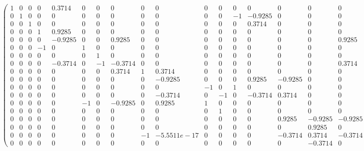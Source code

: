 \documentclass[9pt,letterpaper]{article}
\begin{document}
	\[
	\left(\begin{array}{cccccccccccccccccc} 1 & 0 & 0 & 0 & 0.3714 & 0 & 0 & 0 & 0 & 0 & 0 & 0 & 0 & 0 & 0 & 0 & 0 & 0\\ 0 & 1 & 0 & 0 & 0 & 0 & 0 & 0 & 0 & 0 & 0 & 0 & -1 & -0.9285 & 0 & 0 & 0 & 0\\ 0 & 0 & 1 & 0 & 0 & 0 & 0 & 0 & 0 & 0 & 0 & 0 & 0 & 0.3714 & 0 & 0 & 0 & 0\\ 0 & 0 & 0 & 1 & 0.9285 & 0 & 0 & 0 & 0 & 0 & 0 & 0 & 0 & 0 & 0 & 0 & 0 & 0\\ 0 & 0 & 0 & 0 & -0.9285 & 0 & 0 & 0.9285 & 0 & 0 & 0 & 0 & 0 & 0 & 0 & 0 & 0.9285 & 0\\ 0 & 0 & 0 & -1 & 0 & 1 & 0 & 0 & 0 & 0 & 0 & 0 & 0 & 0 & 0 & 0 & 0 & 0\\ 0 & 0 & 0 & 0 & 0 & 0 & 1 & 0 & 0 & 0 & 0 & 0 & 0 & 0 & 0 & 0 & 0 & 0\\ 0 & 0 & 0 & 0 & -0.3714 & 0 & -1 & -0.3714 & 0 & 0 & 0 & 0 & 0 & 0 & 0 & 0 & 0.3714 & 1\\ 0 & 0 & 0 & 0 & 0 & 0 & 0 & 0.3714 & 1 & 0.3714 & 0 & 0 & 0 & 0 & 0 & 0 & 0 & 0\\ 0 & 0 & 0 & 0 & 0 & 0 & 0 & 0 & 0 & -0.9285 & 0 & 0 & 0 & 0.9285 & -0.9285 & 0 & 0 & 0\\ 0 & 0 & 0 & 0 & 0 & 0 & 0 & 0 & 0 & 0 & -1 & 0 & 1 & 0 & 0 & 0 & 0 & 0\\ 0 & 0 & 0 & 0 & 0 & 0 & 0 & 0 & 0 & -0.3714 & 0 & -1 & 0 & -0.3714 & 0.3714 & 0 & 0 & 0\\ 0 & 0 & 0 & 0 & 0 & -1 & 0 & -0.9285 & 0 & 0.9285 & 1 & 0 & 0 & 0 & 0 & 0 & 0 & 0\\ 0 & 0 & 0 & 0 & 0 & 0 & 0 & 0 & 0 & 0 & 0 & 1 & 0 & 0 & 0 & 0 & 0 & 0\\ 0 & 0 & 0 & 0 & 0 & 0 & 0 & 0 & 0 & 0 & 0 & 0 & 0 & 0 & 0.9285 & -0.9285 & -0.9285 & 0\\ 0 & 0 & 0 & 0 & 0 & 0 & 0 & 0 & 0 & 0 & 0 & 0 & 0 & 0 & 0 & 0.9285 & 0 & 0\\ 0 & 0 & 0 & 0 & 0 & 0 & 0 & 0 & -1 & -5.5511e-17 & 0 & 0 & 0 & 0 & -0.3714 & 0.3714 & -0.3714 & 0\\ 0 & 0 & 0 & 0 & 0 & 0 & 0 & 0 & 0 & 0 & 0 & 0 & 0 & 0 & 0 & -0.3714 & 0 & -1 \end{array}\right)
	\]
	
\end{document}

